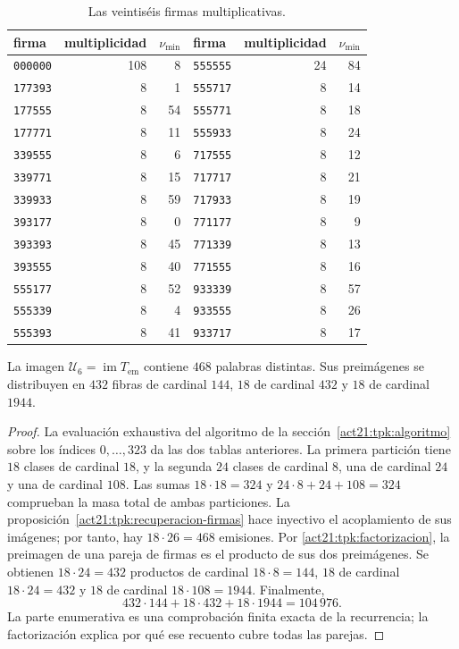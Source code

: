 \begin{minipage}{\linewidth}
\begin{table}[H]
\caption{Las veintiséis firmas multiplicativas.}
\label{act21:tpk:firmas-multiplicativas}
\begin{tabular}{@{}lrr@{\qquad}lrr@{}}
\toprule
firma&multiplicidad&\(\nu_{\min}\)&firma&multiplicidad&\(\nu_{\min}\)\\
\midrule
\texttt{000000}&108&8&\texttt{555555}&24&84\\
\texttt{177393}&8&1&\texttt{555717}&8&14\\
\texttt{177555}&8&54&\texttt{555771}&8&18\\
\texttt{177771}&8&11&\texttt{555933}&8&24\\
\texttt{339555}&8&6&\texttt{717555}&8&12\\
\texttt{339771}&8&15&\texttt{717717}&8&21\\
\texttt{339933}&8&59&\texttt{717933}&8&19\\
\texttt{393177}&8&0&\texttt{771177}&8&9\\
\texttt{393393}&8&45&\texttt{771339}&8&13\\
\texttt{393555}&8&40&\texttt{771555}&8&16\\
\texttt{555177}&8&52&\texttt{933339}&8&57\\
\texttt{555339}&8&4&\texttt{933555}&8&26\\
\texttt{555393}&8&41&\texttt{933717}&8&17\\
\bottomrule
\end{tabular}
\end{table}
\end{minipage}\par


\begin{proposition}
\label{act21:tpk:468}
La imagen \(\mathcal U_6=\operatorname{im}T_{\mathrm{em}}\) contiene
\(468\) palabras distintas. Sus preimágenes se distribuyen en \(432\)
fibras de cardinal \(144\), \(18\) de cardinal \(432\) y \(18\) de
cardinal \(1944\).
\end{proposition}
\begin{proof}
La evaluación exhaustiva del algoritmo de la sección~\ref{act21:tpk:algoritmo}
sobre los índices \(0,\ldots,323\) da las dos tablas anteriores.
La primera partición tiene \(18\) clases de cardinal \(18\), y la segunda
\(24\) clases de cardinal \(8\), una de cardinal \(24\) y una de
cardinal \(108\). Las sumas \(18\cdot18=324\) y
\(24\cdot8+24+108=324\) comprueban la masa total de ambas particiones.
La proposición~\ref{act21:tpk:recuperacion-firmas} hace inyectivo el acoplamiento
de sus imágenes; por tanto, hay \(18\cdot26=468\) emisiones.
Por \eqref{act21:tpk:factorizacion}, la preimagen de una pareja de firmas es
el producto de sus dos preimágenes. Se obtienen \(18\cdot24=432\)
productos de cardinal \(18\cdot8=144\), \(18\) de cardinal
\(18\cdot24=432\) y \(18\) de cardinal \(18\cdot108=1944\).
Finalmente,
\[
 432\cdot144+18\cdot432+18\cdot1944=104\,976.
\]
La parte enumerativa es una comprobación finita exacta de la recurrencia;
la factorización explica por qué ese recuento cubre todas las parejas.
\end{proof}

